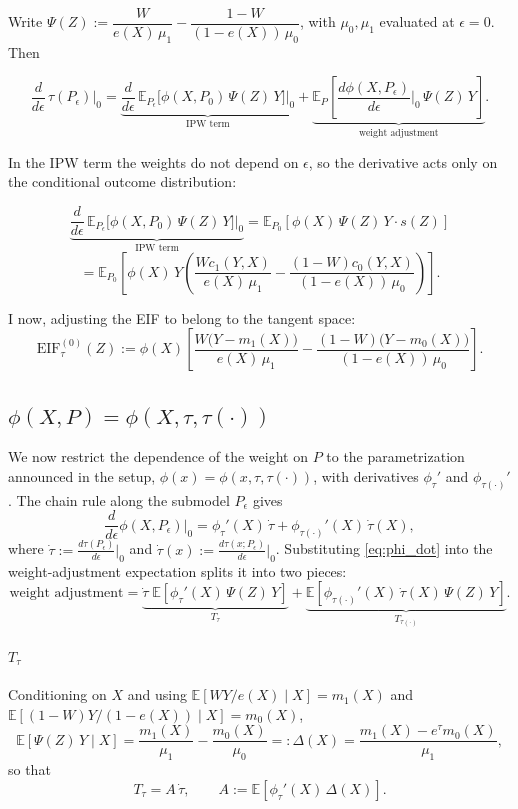 \documentclass{article}
\begin{document}
Write $\Psi(Z) := \dfrac{W}{e(X)\,\mu_1} - \dfrac{1-W}{(1-e(X))\,\mu_0}$, with $\mu_0,\mu_1$ evaluated at $\epsilon=0$.  Then

\[
  \frac{d}{d\epsilon}\,\tau(P_\epsilon)\bigg|_0
  = \underbrace{\frac{d}{d\epsilon}\,\mathbb{E}_{P_\epsilon}\bigl[\phi(X,P_0)\,\Psi(Z)\,Y\bigr]\bigg|_0}_{\text{IPW term}}
  + \underbrace{\mathbb{E}_P\!\left[\frac{d\phi(X,P_\epsilon)}{d\epsilon}\bigg|_0\,\Psi(Z)\,Y\right]}_{\text{weight adjustment}} .
\]

In the IPW term the weights do not depend on $\epsilon$, so the derivative acts only on the conditional outcome distribution:

\[\underbrace{\frac{d}{d\epsilon}\,\mathbb{E}_{P_\epsilon}\bigl[\phi(X,P_0)\,\Psi(Z)\,Y\bigr]\bigg|_0}_{\text{IPW term}}
= \mathbb{E}_{P_0}\!\left[\phi(X)\,\Psi(Z)\,Y\cdot s(Z)\right] \]\[
= \mathbb{E}_{P_0}\!\left[\phi(X)\,Y\!\left(\frac{W c_1(Y,X)}{e(X)\,\mu_1} - \frac{(1-W) c_0(Y,X)}{(1-e(X))\,\mu_0}\right)\right].\]

I now, adjusting the EIF to belong to the tangent space:
\[
  \mathrm{EIF}^{(0)}_\tau(Z)
  := \phi(X)\!\left[\frac{W\bigl(Y-m_1(X)\bigr)}{e(X)\,\mu_1}
    - \frac{(1-W)\bigl(Y-m_0(X)\bigr)}{(1-e(X))\,\mu_0}\right].
\]


\subsection*{$\phi(X,P)=\phi(X,\tau,\tau(\cdot))$}

We now restrict the dependence of the weight on $P$ to the parametrization announced in the setup, $\phi(x) = \phi(x,\tau,\tau(\cdot))$, with derivatives $\phi_\tau'$ and $\phi_{\tau(\cdot)}'$.  The chain rule along the submodel $P_\epsilon$ gives
\begin{equation}
  \label{eq:phi_dot}
  \frac{d}{d\epsilon}\phi(X,P_\epsilon)\bigg|_0
  = \phi_\tau'(X)\,\dot\tau + \phi_{\tau(\cdot)}'(X)\,\dot\tau(X),
\end{equation}
where $\dot\tau := \frac{d\tau(P_\epsilon)}{d\epsilon}|_0$ and $\dot\tau(x) := \frac{d\tau(x;P_\epsilon)}{d\epsilon}|_0$.  Substituting \eqref{eq:phi_dot} into the weight-adjustment expectation splits it into two pieces:
\[
  \text{weight adjustment}
  = \underbrace{\dot\tau\;\mathbb{E}\!\left[\phi_\tau'(X)\,\Psi(Z)\,Y\right]}_{T_\tau}
  + \underbrace{\mathbb{E}\!\left[\phi_{\tau(\cdot)}'(X)\,\dot\tau(X)\,\Psi(Z)\,Y\right]}_{T_{\tau(\cdot)}}.
\]

\paragraph{$T_\tau$}
Conditioning on $X$ and using $\mathbb{E}[WY/e(X)\mid X]=m_1(X)$ and $\mathbb{E}[(1-W)Y/(1-e(X))\mid X]=m_0(X)$,
\begin{equation}
  \label{eq:Delta}
  \mathbb{E}\!\left[\Psi(Z)\,Y\mid X\right]
  = \frac{m_1(X)}{\mu_1} - \frac{m_0(X)}{\mu_0}
  =: \Delta(X)
  = \frac{m_1(X)-e^{\tau}m_0(X)}{\mu_1},
\end{equation}
so that
\begin{equation}
  \label{eq:T_tau}
  T_\tau = A\,\dot\tau,\qquad
  A := \mathbb{E}\!\left[\phi_\tau'(X)\,\Delta(X)\right].
\end{equation}
\end{document}
